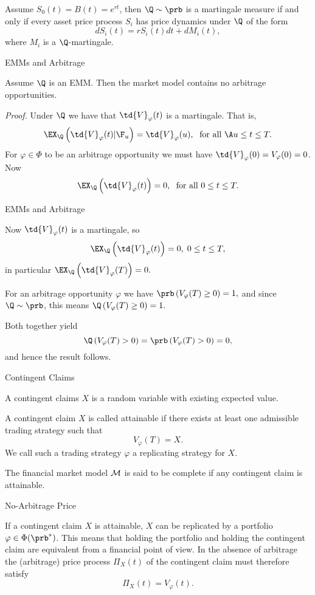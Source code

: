 Assume $S_0(t) = B(t) = e^{rt}$, then $\Q \sim \prb$ is a
martingale measure if and only if every asset price process $S_i$
has price dynamics under $\Q$ of the form
$$
dS_i(t) = r S_i(t) dt + dM_i(t),
$$
where $M_i$ is a $\Q$-martingale.

{ EMMs and Arbitrage}

Assume $\Q$ is an EMM. Then the market model contains no arbitrage
opportunities.

{\it Proof.} Under $\Q$ we have that $\td{V}_\varphi(t)$ is a
martingale. That is,
$$
\EX_{\Q}\left(\td{V}_\varphi(t)|\F_u\right) = \td{V}_\varphi(u),\;
\mbox{ for all }\A u \leq t \leq T.
$$
For $\varphi \in \Phi$ to be an arbitrage opportunity we must have
$\td{V}_\varphi(0) =V_\varphi(0)= 0$.  Now
$$
\EX_{\Q}\left(\td{V}_\varphi(t)\right) = 0,\; \mbox{ for all } 0
\leq t \leq T.
$$

{ EMMs and Arbitrage}

Now $\td{V}_\varphi(t)$ is a martingale, so
$$
\EX_{\Q}\left(\td{V}_\varphi(t)\right) = 0,\; 0 \leq t \leq T,
$$
in particular $ \EX_{\Q}\left(\td{V}_\varphi(T)\right) = 0. $

For an arbitrage opportunity $\varphi$ we have $
\prb\left(V_\varphi(T) \geq 0\right) =1, $ and since $\Q \sim
\prb$, this means $ \Q\left(V_\varphi(T) \geq 0\right) =1. $

Both together yield
$$
\Q\left(V_\varphi(T) > 0\right) = \prb\left(V_\varphi(T) >
0\right) =0,
$$
and hence the result follows.\hfill \eb

{ Contingent Claims}

A contingent claims $X$ is a random variable with existing expected value.
\item<1-> A contingent claim $X$ is called attainable if there
exists at least one admissible trading strategy such that
$$
V_\varphi(T) = X.
$$
We call such a  trading strategy $\varphi$ a replicating strategy
for $X$. \item<2-> The financial market model ${\cal M}$ is said
to be complete if any contingent claim is attainable.


{ No-Arbitrage Price}

If a contingent claim $X$ is attainable, $X$ can be replicated by
a portfolio $\varphi \in \Phi(\prb^*)$. This means that holding
the portfolio and holding the contingent claim are equivalent from
a financial point of view. In the absence of arbitrage the
(arbitrage) price process $\Pi_X(t)$ of the contingent claim must
therefore satisfy
$$
\Pi_X(t) = V_\varphi(t).
$$


